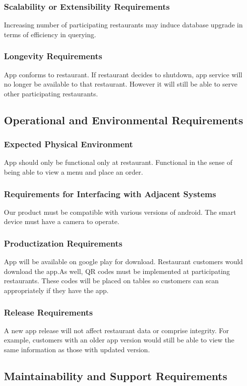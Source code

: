 \documentclass[12pt, titlepage]{article}
\begin{document}
\subsubsection{Scalability or Extensibility Requirements}
Increasing number of participating restaurants may induce database upgrade in terms of efficiency in querying.   
\subsubsection{Longevity Requirements}
App conforms to restaurant. If restaurant decides to shutdown, app service will no longer be available to that restaurant. However it will still be able to serve other participating restaurants.

\subsection{Operational and Environmental Requirements}
\subsubsection{Expected Physical Environment}
App should only be functional only at restaurant. Functional in the sense of being able to view a menu and place an order.
\subsubsection{Requirements for Interfacing with Adjacent Systems}
Our product must be compatible with various versions of android. The smart device must have a camera to operate. 
\subsubsection{Productization Requirements}
App will be available on google play for download. Restaurant customers would download the app.As well, QR codes must be implemented at participating restaurants. These codes will be placed on tables so customers can scan appropriately if they have the app. 
\subsubsection{Release Requirements}
A new app release will not affect restaurant data or comprise integrity. For example, customers with an older app version would still be able to view the same information as those with updated version. 
\subsection{Maintainability and Support Requirements}
\end{document}
